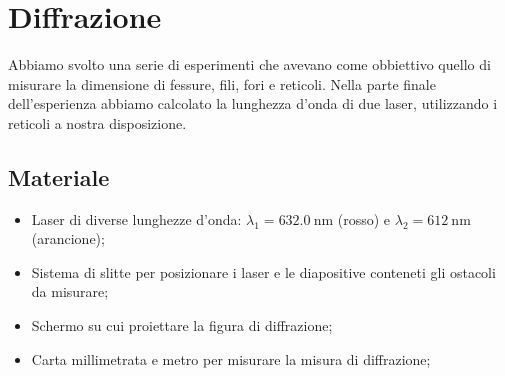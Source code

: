 \section{Diffrazione}

Abbiamo svolto una serie di esperimenti che avevano come obbiettivo quello di misurare la dimensione di fessure, fili,
fori e reticoli. Nella parte finale dell'esperienza abbiamo calcolato la lunghezza d'onda di due laser,
utilizzando i reticoli a nostra disposizione.

\subsection{Materiale}

\begin{itemize}
    \item{Laser di diverse lunghezze d'onda: $\lambda_1 = \SI{632.0}{\nano\metre}$ (rosso) e $\lambda_2 = \SI{612}{\nano\metre}$ (arancione);}
    \item{Sistema di slitte per posizionare i laser e le diapositive conteneti gli ostacoli da misurare;}
    \item{Schermo su cui proiettare la figura di diffrazione;}
    \item{Carta millimetrata e metro per misurare la misura di diffrazione;}
\end{itemize}
